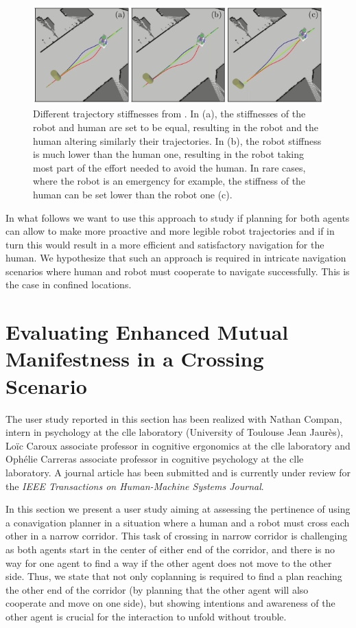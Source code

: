 \documentclass[a4paper,11pt,twoside]{StyleThese}
\begin{document}
\begin{figure}[hbtp]
\centering
\includegraphics[width=\textwidth]{figures/chapter2/hateb_effort.png}
\caption{Different trajectory stiffnesses from \cite{khambhaita_viewing_2017}. In (a), the stiffnesses of the robot and human are set to be equal, resulting in the robot and the human altering similarly their trajectories. In (b), the robot stiffness is much lower than the human one, resulting in the robot taking most part of the effort needed to avoid the human. In rare cases, where the robot is an emergency for example, the stiffness of the human can be set lower than the robot one (c).}
\label{fig:hateb_effort}
\end{figure}

In what follows we want to use this approach to study if planning for both agents can allow to make more proactive and more legible robot trajectories and if in turn this would result in a more efficient and satisfactory navigation for the human. We hypothesize that such an approach is required in intricate navigation scenarios where human and robot must cooperate to navigate successfully. This is the case in confined locations.

\section[Evaluation Through a User Study]{Evaluating Enhanced Mutual Manifestness in a Crossing Scenario}

The user study reported in this section has been realized with Nathan Compan, intern in psychology at the \acrfull{clle} laboratory (University of Toulouse Jean Jaurès), Lo\"ic Caroux associate professor in cognitive ergonomics at the \acrshort{clle} laboratory and Ophélie Carreras associate professor in cognitive psychology at the \acrshort{clle} laboratory. A journal article has been submitted and is currently under review for the \textit{IEEE Transactions on Human-Machine Systems Journal}.

In this section we present a user study aiming at assessing the pertinence of using a conavigation planner in a situation where a human and a robot must cross each other in a narrow corridor. This task of crossing in narrow corridor is challenging as both agents start in the center of either end of the corridor, and there is no way for one agent to find a way if the other agent does not move to the other side. Thus, we state that not only coplanning is required to find a plan reaching the other end of the corridor (by planning that the other agent will also cooperate and move on one side), but showing intentions and awareness of the other agent is crucial for the interaction to unfold without trouble.
\end{document}
